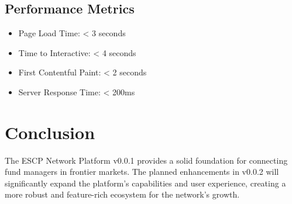 \documentclass[11pt,a4paper]{article}
\begin{document}
\subsection{Performance Metrics}
\begin{itemize}[leftmargin=*]
    \item Page Load Time: < 3 seconds
    \item Time to Interactive: < 4 seconds
    \item First Contentful Paint: < 2 seconds
    \item Server Response Time: < 200ms
\end{itemize}

\section{Conclusion}
The ESCP Network Platform v0.0.1 provides a solid foundation for connecting fund managers in frontier markets. The planned enhancements in v0.0.2 will significantly expand the platform's capabilities and user experience, creating a more robust and feature-rich ecosystem for the network's growth.
\end{document}
